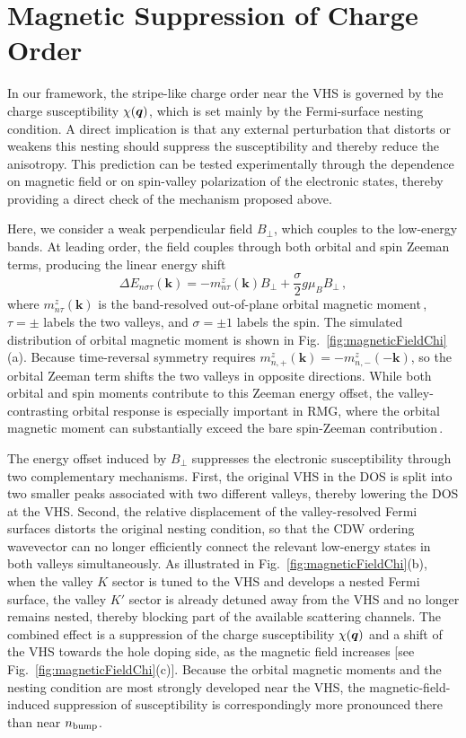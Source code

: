 \documentclass[aps,prx,article,twocolumn,amsmath,amssymb,superscriptaddress,longbibliography]{revtex4-2}
\begin{document}
\section{Magnetic Suppression of Charge Order}\label{sec:magneticField}

In our framework, the stripe-like charge order near the VHS is governed by the charge susceptibility $\chi({\vb*{q}})$, which is set mainly by the Fermi-surface nesting condition. A direct implication is that any external perturbation that distorts or weakens this nesting should suppress the susceptibility and thereby reduce the anisotropy. This prediction can be tested experimentally through the dependence on magnetic field or on spin-valley polarization of the electronic states, thereby providing a direct check of the mechanism proposed above.



 
Here, we consider a weak perpendicular field $B_{\perp}$, which couples to the low-energy bands. At leading order, the field couples through both orbital and spin Zeeman terms, producing the linear energy shift
\begin{equation}
\Delta E_{n \sigma \tau}(\mathbf{k}) = - m_{n\tau}^{z}(\mathbf{k}) B_{\perp} + \frac{\sigma}{2} g \mu_B B_{\perp}\,,
\end{equation}
where $m_{n\tau}^{z}(\mathbf{k})$ is the band-resolved out-of-plane orbital magnetic moment\,\cite{resta06om,xiao06prlberry}, $\tau=\pm$ labels the two valleys, and $\sigma=\pm1$ labels the spin. The simulated distribution of orbital magnetic moment is shown in Fig.~\ref{fig:magneticFieldChi}(a). Because time-reversal symmetry requires $m_{n,+}^{z}(\mathbf{k})=-m_{n,-}^{z}(-\mathbf{k})$, so the orbital Zeeman term shifts the two valleys in opposite directions. While both orbital and spin moments contribute to this Zeeman energy offset, the valley-contrasting orbital response is especially important in RMG, where the orbital magnetic moment can substantially exceed the bare spin-Zeeman contribution\,\cite{huang2023spin}.

The energy offset induced by $B_\perp$ suppresses the electronic susceptibility through two complementary mechanisms. First, the original VHS in the DOS is split into two smaller peaks associated with two different valleys, thereby lowering the DOS at the VHS. Second, the relative displacement of the valley-resolved Fermi surfaces distorts the original nesting condition, so that the CDW ordering wavevector can no longer efficiently connect the relevant low-energy states in both valleys simultaneously. As illustrated in Fig.~\ref{fig:magneticFieldChi}(b), when the valley $K$ sector is tuned to the VHS and develops a nested Fermi surface, the valley $K'$ sector is already detuned away from the VHS and no longer remains nested, thereby blocking part of the available scattering channels. The combined effect is a suppression of the charge susceptibility $\chi({\vb*{q}})$ and a shift of the VHS towards the hole doping side, as the magnetic field increases [see Fig.~\ref{fig:magneticFieldChi}(c)]. Because the orbital magnetic moments and the nesting condition are most strongly developed near the VHS, the magnetic-field-induced suppression of susceptibility is correspondingly more pronounced there than near $n_{\rm bump}$.
\end{document}
